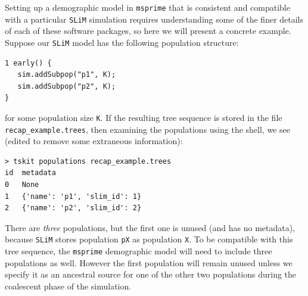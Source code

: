 \documentclass[12pt]{article}
\newcommand{\msprime}[0]{\texttt{msprime}\xspace}
\newcommand{\slim}[0]{\texttt{SLiM}\xspace}
\begin{document}
Setting up a demographic model in \msprime that is consistent and compatible with a particular \slim simulation requires
understanding some of the finer details of each of these software packages, so here we will present a concrete example.
Suppose our \slim model has the following population structure:
\begin{verbatim}
1 early() {
   sim.addSubpop("p1", K);
   sim.addSubpop("p2", K);
}
\end{verbatim}
for some population size \verb|K|.
If the resulting tree sequence is stored in the file \texttt{recap\_example.trees},
then examining the populations using the shell, we see
(edited to remove some extraneous information):
\begin{verbatim}
> tskit populations recap_example.trees
id	metadata
0	None
1	{'name': 'p1', 'slim_id': 1}
2	{'name': 'p2', 'slim_id': 2}
\end{verbatim}
There are \emph{three} populations, but the first one is unused (and has no metadata),
because \slim stores population \texttt{pX} as population \texttt{X}.
To be compatible with this tree sequence, the \msprime demographic model will need to include three populations as well.
However the first population will remain unused unless we specify it as an ancestral source for
one of the other two populations during the coalescent phase of the simulation.
\end{document}
